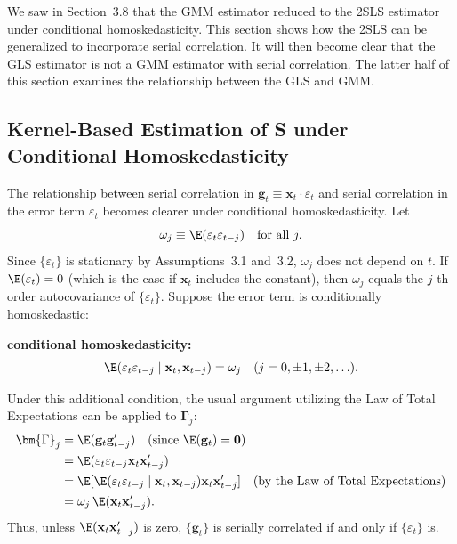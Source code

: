
We saw in Section~3.8 that the GMM estimator reduced to the 2SLS estimator
under conditional homoskedasticity. This section shows how the 2SLS can be
generalized to incorporate serial correlation. It will then become clear that the
GLS estimator is not a GMM estimator with serial correlation. The latter half of
this section examines the relationship between the GLS and GMM.

\subsection*{Kernel-Based Estimation of S under Conditional Homoskedasticity}

The relationship between serial correlation in $\mathbf{g}_t \equiv \mathbf{x}_t \cdot \varepsilon_t$ and serial correlation in
the error term $\varepsilon_t$ becomes clearer under conditional homoskedasticity. Let
\begin{equation}
  \omega_j \equiv \E(\varepsilon_t \varepsilon_{t-j}) \quad \text{for all } j.
  \label{eq:6.7.1}
\end{equation}
Since $\{\varepsilon_t\}$ is stationary by Assumptions~3.1 and~3.2, $\omega_j$ does not depend on $t$.
If $\E(\varepsilon_t) = 0$ (which is the case if $\mathbf{x}_t$ includes the constant), then $\omega_j$ equals the
$j$-th order autocovariance of $\{\varepsilon_t\}$. Suppose the error term is conditionally
homoskedastic:

\medskip
\noindent\textbf{conditional homoskedasticity:}
\begin{equation}
  \E(\varepsilon_t \varepsilon_{t-j} \mid \mathbf{x}_t, \mathbf{x}_{t-j}) = \omega_j
  \quad (j = 0, \pm 1, \pm 2, \ldots).
  \label{eq:6.7.2}
\end{equation}

Under this additional condition, the usual argument utilizing the Law of Total
Expectations can be applied to $\bm{\Gamma}_j$:
\begin{align}
  \bm{\Gamma}_j &= \E(\mathbf{g}_t \mathbf{g}_{t-j}') \quad (\text{since } \E(\mathbf{g}_t) = \mathbf{0}) \notag \\
  &= \E(\varepsilon_t \varepsilon_{t-j} \mathbf{x}_t \mathbf{x}_{t-j}') \notag \\
  &= \E[\E(\varepsilon_t \varepsilon_{t-j} \mid \mathbf{x}_t, \mathbf{x}_{t-j}) \mathbf{x}_t \mathbf{x}_{t-j}']
  \quad \text{(by the Law of Total Expectations)} \notag \\
  &= \omega_j\,\E(\mathbf{x}_t \mathbf{x}_{t-j}').
  \label{eq:6.7.3}
\end{align}
Thus, unless $\E(\mathbf{x}_t \mathbf{x}_{t-j}')$ is zero, $\{\mathbf{g}_t\}$ is serially correlated if and only if $\{\varepsilon_t\}$ is.

